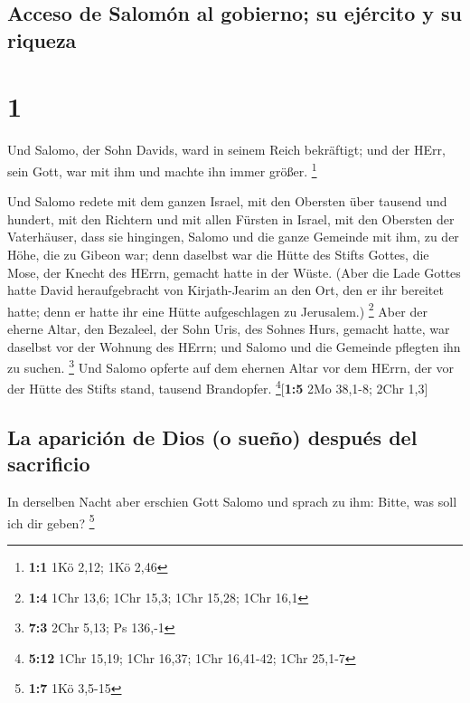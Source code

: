 \hypertarget{acceso-de-salomuxf3n-al-gobierno-su-ejuxe9rcito-y-su-riqueza}{%
\subsection{Acceso de Salomón al gobierno; su ejército y su
riqueza}\label{acceso-de-salomuxf3n-al-gobierno-su-ejuxe9rcito-y-su-riqueza}}

\hypertarget{section}{%
\section{1}\label{section}}

 Und Salomo, der Sohn Davids, ward in seinem Reich
bekräftigt; und der HErr, sein Gott, war mit ihm und machte ihn immer
größer. \footnote{\textbf{1:1} 1Kö 2,12; 1Kö 2,46}

 Und Salomo redete mit dem ganzen Israel, mit den Obersten
über tausend und hundert, mit den Richtern und mit allen Fürsten in
Israel, mit den Obersten der Vaterhäuser,  dass sie
hingingen, Salomo und die ganze Gemeinde mit ihm, zu der Höhe, die zu
Gibeon war; denn daselbst war die Hütte des Stifts Gottes, die Mose, der
Knecht des HErrn, gemacht hatte in der Wüste.  (Aber die
Lade Gottes hatte David heraufgebracht von Kirjath-Jearim an den Ort,
den er ihr bereitet hatte; denn er hatte ihr eine Hütte aufgeschlagen zu
Jerusalem.) \footnote{\textbf{1:4} 1Chr 13,6; 1Chr 15,3; 1Chr 15,28;
  1Chr 16,1}  Aber der eherne Altar, den Bezaleel, der
Sohn Uris, des Sohnes Hurs, gemacht hatte, war daselbst vor der Wohnung
des HErrn; und Salomo und die Gemeinde pflegten ihn zu suchen.
\footnote{\textbf{7:3} 2Chr 5,13; Ps 136,-1}  Und Salomo
opferte auf dem ehernen Altar vor dem HErrn, der vor der Hütte des
Stifts stand, tausend Brandopfer. \footnote{\textbf{5:12} 1Chr 15,19;
  1Chr 16,37; 1Chr 16,41-42; 1Chr 25,1-7}{[}\textbf{1:5} 2Mo 38,1-8;
2Chr 1,3{]}

\hypertarget{la-apariciuxf3n-de-dios-o-sueuxf1o-despuuxe9s-del-sacrificio}{%
\subsection{La aparición de Dios (o sueño) después del
sacrificio}\label{la-apariciuxf3n-de-dios-o-sueuxf1o-despuuxe9s-del-sacrificio}}

 In derselben Nacht aber erschien Gott Salomo und sprach
zu ihm: Bitte, was soll ich dir geben? \footnote{\textbf{1:7} 1Kö 3,5-15}

